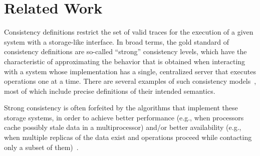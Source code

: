 \documentclass[acmlarge, ,11pt]{acmart}
\begin{document}

 \section{Related Work} \label{sec:related}
 Consistency definitions restrict the set of valid traces for the execution of a given system with a storage-like interface. In broad terms, the gold standard of consistency definitions are so-called ``strong'' consistency levels, which have the characteristic of approximating the behavior that is obtained when interacting with a system whose implementation has a single, centralized server that executes operations one at a time. There are several examples of such consistency models~\cite{Ahamad94causalmemory:, Attiya:1994:SCV:176575.176576, Herlihy:1990:LCC:78969.78972, Lamport:1979:MMC:1311099.1311750, opac-b1024856, Mizuno1995, Raynal1995}, most of which include precise definitions of their intended semantics.

Strong consistency is often forfeited by the algorithms that implement these storage systems, in order to achieve better performance (e.g., when processors cache possibly stale data in a multiprocessor) and/or better availability (e.g., when multiple replicas of the data exist and operations proceed while contacting only a subset of them)~\cite{Lakshman:2010:CDS:1773912.1773922, Sumbaly_servinglarge-scale, Meiklejohn:2013:RPD:2505305.2505309, Plugge:2010:DGM:1869938, Schutt:2008:SRT:1411273.1411280, DeCandia:2007:DAH:1323293.1294281}.
\end{document}
